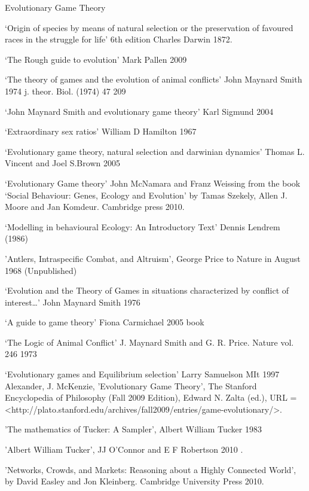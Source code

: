 \documentclass{article}
\begin{document}
Evolutionary Game Theory

‘Origin of species by means of natural selection or the preservation of favoured races in the struggle for life’ 6th edition Charles
Darwin 1872.

‘The Rough guide to evolution’ Mark Pallen 2009

‘The theory of games and the evolution of animal conflicts’ John Maynard Smith 1974 j. theor. Biol. (1974) 47  209

‘John Maynard Smith and evolutionary game theory’ Karl Sigmund 2004

‘Extraordinary sex ratios’ William D Hamilton 1967

‘Evolutionary game theory, natural selection and darwinian dynamics’ Thomas L. Vincent and Joel S.Brown 2005

‘Evolutionary Game theory’ John McNamara and Franz Weissing from the book ‘Social Behaviour: Genes, Ecology and Evolution’ by
Tamas Szekely, Allen J. Moore and Jan Komdeur. Cambridge press 2010.

‘Modelling in behavioural Ecology: An Introductory Text’ Dennis Lendrem (1986)

 'Antlers, Intraspecific Combat, and Altruism', George Price to Nature in August 1968 (Unpublished)

‘Evolution and the Theory of Games in situations characterized by conflict of interest…’ John Maynard Smith 1976

‘A guide to game theory’ Fiona Carmichael 2005 book

‘The Logic of Animal Conflict' J. Maynard Smith and G. R. Price. Nature vol. 246 1973

‘Evolutionary games and Equilibrium selection’ Larry Samuelson MIt 1997
Alexander, J. McKenzie, 'Evolutionary Game Theory', The Stanford Encyclopedia of Philosophy (Fall 2009 Edition), Edward N. Zalta (ed.), URL = <http://plato.stanford.edu/archives/fall2009/entries/game-evolutionary/>.

'The mathematics of Tucker: A Sampler', Albert William Tucker 1983

'Albert William Tucker', JJ O’Connor and E F Robertson 2010 .

'Networks, Crowds, and Markets: Reasoning about a Highly Connected World', by David Easley and Jon Kleinberg. Cambridge University Press 2010.
\end{document}

